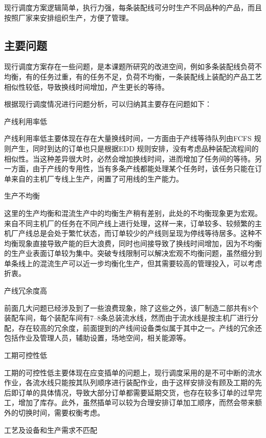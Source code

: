 现行调度方案逻辑简单，执行力强，每条装配线可分时生产不同品种的产品，而且按照厂家来安排组织生产，方便了管理。
\subsection{主要问题}
现行调度方案存在一些问题，是本课题所研究的改进空间，例如多条装配线负荷不均衡，有的任务过重，有的任务不足，负荷不均衡，一条装配线上装配的产品工艺相似性较低，导致换线时间增加，产生更长的等待。

根据现行调度情况进行问题分析，可以归纳其主要存在问题如下：
\renewcommand{\labelenumi}{(\theenumi)}
\begin{asparaenum}
\item 产线利用率低

产线利用率低主要体现在存在大量换线时间，一方面由于产线等待队列由FCFS 规则产生，同时到达的订单也只是根据EDD 规则安排，没有考虑品种装配流程间的相似性。当这种差异很大时，必然会增加换线时间，进而增加了任务间的等待。另一方面，由于产线的专用性，当有多条产线都能处理某个任务时，该任务只能在订单来自的主机厂专线上生产，闲置了可用线的生产能力。
\item 生产不均衡

这里的生产均衡和混流生产中的均衡生产稍有差别，此处的不均衡现象更为宏观。来自不同主机厂的任务在不同产线上进行处理，这样一来，订单较多、较频繁的主机厂产线总是会处于繁忙状态，而订单较少的产线则呈现为停线等待居多。这种不均衡现象直接导致产能的巨大浪费，同时也间接导致了换线时间增加，因为不均衡的生产业表面订单较为集中。突破专线限制可以解决宏观不均衡问题，虽然细分到单条线上的混流生产可以近一步均衡化生产，但其需要较高的管理投入，可以考虑折衷。
\item 产线冗余度高

前面几大问题已经涉及到了一些浪费现象，除了这些之外，该厂制造二部共有8个装配车间，每个装配车间有7--8条总装流水线，然而由于流水线是按主机厂进行分配，存在较高的冗余度，前面提到的产线间设备类似属于其中之一。产线的冗余还包括作业及管理人员，辅助设置，场地空间，相关能源等。
\item 工期可控性低

工期的可控性低主要体现在应变插单的问题上，现行调度采用的是不可中断的流水作业，各流水线只能按其队列顺序进行装配作业，由于这样安排没有顾及工期的先后即订单的具体情况，导致大部分订单都需要延期交货，也存在较多订单的过早完工，增加了库存。此外，虽然插单可以较为合理安排订单加工顺序，而然会带来额外的切换时间，需要权衡考虑。
\item 工艺及设备和生产需求不匹配
\end{asparaenum}

